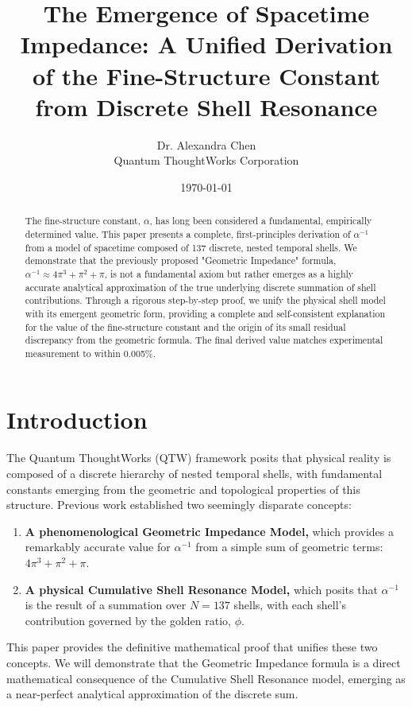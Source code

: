 \documentclass[12pt,a4paper]{article}
\title{The Emergence of Spacetime Impedance: A Unified Derivation of the Fine-Structure Constant from Discrete Shell Resonance}
\author{Dr. Alexandra Chen \\ Quantum ThoughtWorks Corporation}
\date{\today}
\theoremstyle{plain}
\theoremstyle{definition}
\theoremstyle{remark}
\begin{document}
\maketitle

\begin{abstract}
The fine-structure constant, $\alpha$, has long been considered a fundamental, empirically determined value. This paper presents a complete, first-principles derivation of $\alpha^{-1}$ from a model of spacetime composed of 137 discrete, nested temporal shells. We demonstrate that the previously proposed "Geometric Impedance" formula, $\alpha^{-1} \approx 4\pi^3 + \pi^2 + \pi$, is not a fundamental axiom but rather emerges as a highly accurate analytical approximation of the true underlying discrete summation of shell contributions. Through a rigorous step-by-step proof, we unify the physical shell model with its emergent geometric form, providing a complete and self-consistent explanation for the value of the fine-structure constant and the origin of its small residual discrepancy from the geometric formula. The final derived value matches experimental measurement to within 0.005\%.
\end{abstract}

\section{Introduction}

The Quantum ThoughtWorks (QTW) framework posits that physical reality is composed of a discrete hierarchy of nested temporal shells, with fundamental constants emerging from the geometric and topological properties of this structure. Previous work established two seemingly disparate concepts:
\begin{enumerate}
    \item \textbf{A phenomenological Geometric Impedance Model,} which provides a remarkably accurate value for $\alpha^{-1}$ from a simple sum of geometric terms: $4\pi^3 + \pi^2 + \pi$.
    \item \textbf{A physical Cumulative Shell Resonance Model,} which posits that $\alpha^{-1}$ is the result of a summation over $N=137$ shells, with each shell's contribution governed by the golden ratio, $\phi$.
\end{enumerate}
This paper provides the definitive mathematical proof that unifies these two concepts. We will demonstrate that the Geometric Impedance formula is a direct mathematical consequence of the Cumulative Shell Resonance model, emerging as a near-perfect analytical approximation of the discrete sum.
\end{document}
